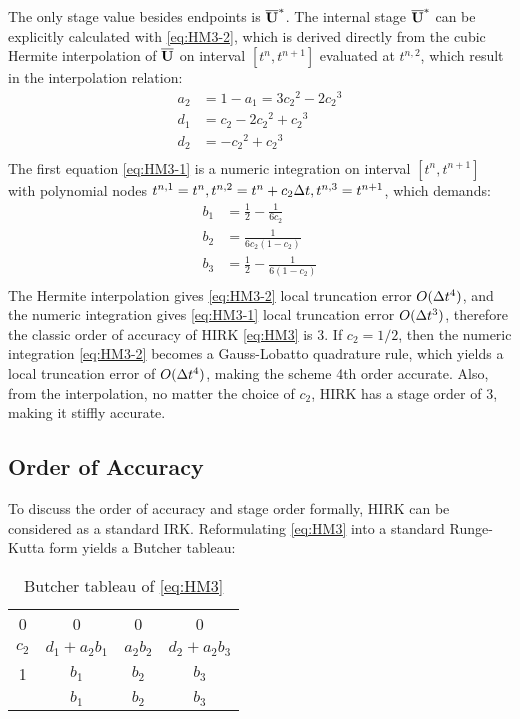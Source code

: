 \documentclass[preprint,12pt]{elsarticle}
\begin{document}
The only stage value besides endpoints is $\overline{\mathbf{U}}^*$.
The internal stage $\overline{\mathbf{U}}^*$ can be explicitly
calculated with \eqref{eq:HM3-2}, which is derived
directly from the cubic Hermite interpolation of $\overline{\mathbf{U}}$
on interval $[t^n,t^{n+1}]$ evaluated at
$t^{n,2}$, which result in the interpolation relation:
\begin{equation}
    \begin{aligned}
        a_2 & = 1 - a_1 = 3{c_2}^2 - 2 {c_2}^3 \\
        d_1 & = {c_2} - 2 {c_2}^2 + {c_2}^3    \\
        d_2 & = - {c_2}^2 + {c_2}^3            \\
    \end{aligned}
    \label{eq:interp}
\end{equation}
The first equation \eqref{eq:HM3-1} is
a numeric integration on interval $[t^n,t^{n+1}]$ with
polynomial nodes
$t^{n,1}=t^n,t^{n,2}=t^n+c_2\mathrm\Delta t,t^{n,3}=t^{n+1}$, which demands:
\begin{equation}
    \begin{aligned}
        b_1 & = \frac{1}{2} - \frac{1}{6{c_2}}     \\
        b_2 & = \frac{1}{6{c_2}(1-{c_2})}          \\
        b_3 & = \frac{1}{2} - \frac{1}{6(1-{c_2})} \\
    \end{aligned}
    \label{eq:integ}
\end{equation}
The Hermite interpolation gives \eqref{eq:HM3-2}
local truncation error $O(\mathrm\Delta t^4)$,
and the numeric integration gives \eqref{eq:HM3-1}
local truncation error $O(\mathrm\Delta t^3)$, therefore the
classic order of accuracy of HIRK \eqref{eq:HM3} is
3. If $c_2=1/2$, then the numeric integration \eqref{eq:HM3-2}
becomes a Gauss-Lobatto quadrature rule, which yields
a local truncation error of $O(\mathrm\Delta t^4)$, making
the scheme 4th order accurate.
Also, from the interpolation, no matter
the choice of $c_2$, HIRK has a stage order of
3, making it stiffly accurate.



\subsection{Order of Accuracy}
To discuss the order of accuracy and stage order 
formally, HIRK can be considered as a standard IRK.
Reformulating \eqref{eq:HM3} into
a standard Runge-Kutta form yields a Butcher
tableau:
\begin{table}[htbp]
    \centering
    \begin{tabular}{c|ccc}
        0     & 0              & 0        & 0              \\
        $c_2$ & $d_1 + a_2b_1$ & $a_2b_2$ & $d_2 + a_2b_3$ \\
        1     & $b_1$          & $b_2$    & $b_3$          \\ \hline
              & $b_1$          & $b_2$    & $b_3$
    \end{tabular}
    \caption{Butcher tableau of \eqref{eq:HM3}}
    \label{tab:HM3Butcher}
\end{table}
\end{document}
